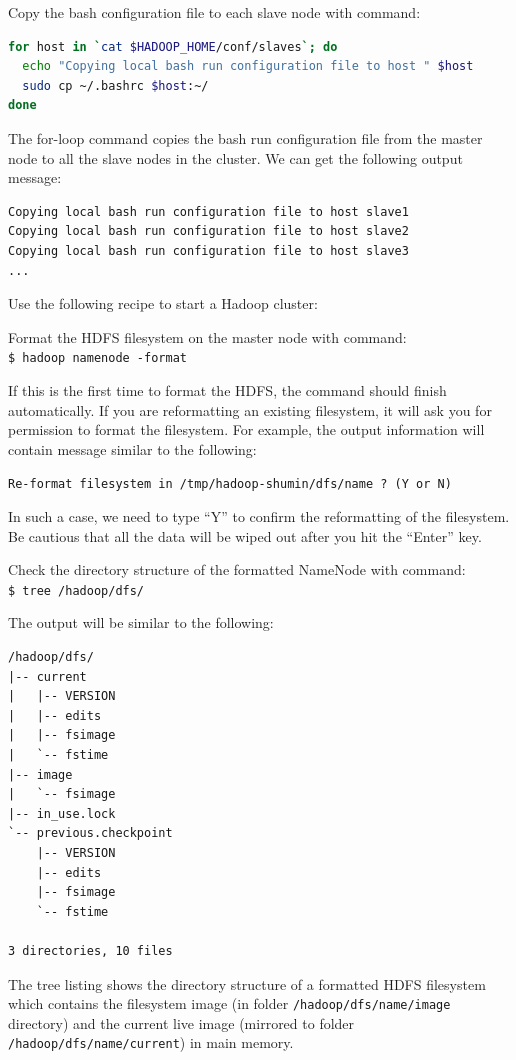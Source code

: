 Copy the bash configuration file to each slave node with command:
\lstset{style=bashstyle}
\begin{lstlisting}[language=bash]
for host in `cat $HADOOP_HOME/conf/slaves`; do
  echo "Copying local bash run configuration file to host " $host
  sudo cp ~/.bashrc $host:~/
done
\end{lstlisting}

The for-loop command copies the bash run configuration file from the master node to all the slave nodes in the cluster. We can get the following output message:
\lstset{style=bashstyle}
\begin{lstlisting}
Copying local bash run configuration file to host slave1
Copying local bash run configuration file to host slave2
Copying local bash run configuration file to host slave3
...
\end{lstlisting}

Use the following recipe to start a Hadoop cluster:

Format the HDFS filesystem on the master node with command: \\
\verb|$ hadoop namenode -format|

If this is the first time to format the HDFS, the command should finish automatically. If you are reformatting an existing filesystem, it will ask you for permission to format the filesystem. For example, the output information will contain message similar to the following:

\verb|Re-format filesystem in /tmp/hadoop-shumin/dfs/name ? (Y or N)|

In such a case, we need to type ``Y'' to confirm the reformatting of the filesystem. Be cautious that all the data will be wiped out after you hit the ``Enter'' key.

Check the directory structure of the formatted NameNode with command: \\
\verb|$ tree /hadoop/dfs/|

The output will be similar to the following:
\lstset{style=bashstyle}
\begin{lstlisting}
/hadoop/dfs/
|-- current
|   |-- VERSION
|   |-- edits
|   |-- fsimage
|   `-- fstime
|-- image
|   `-- fsimage
|-- in_use.lock
`-- previous.checkpoint
    |-- VERSION
    |-- edits
    |-- fsimage
    `-- fstime

3 directories, 10 files
\end{lstlisting}

The tree listing shows the directory structure of a formatted HDFS filesystem which contains the filesystem image (in folder \verb|/hadoop/dfs/name/image| directory) and the current live image (mirrored to folder \verb|/hadoop/dfs/name/current|) in main memory.

